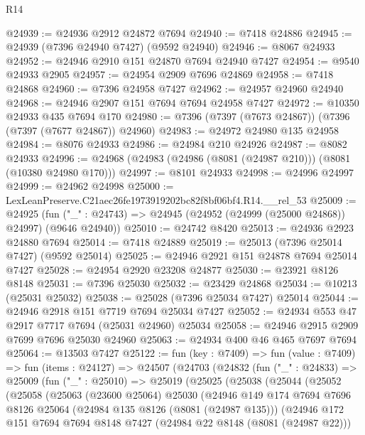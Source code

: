 \begin{lexlean}{R14}
\begin{coremodule}
@24939 := @24936 @2912 @24872 @7694
@24940 := @7418 @24886
@24945 := @24939 (@7396 @24940 @7427) (@9592 @24940)
@24946 := @8067 @24933
@24952 := @24946 @2910 @151 @24870 @7694 @24940 @7427
@24954 := @9540 @24933 @2905
@24957 := @24954 @2909 @7696 @24869
@24958 := @7418 @24868
@24960 := @7396 @24958 @7427
@24962 := @24957 @24960 @24940
@24968 := @24946 @2907 @151 @7694 @7694 @24958 @7427
@24972 := @10350 @24933 @435 @7694 @170
@24980 := @7396 (@7397 (@7673 @24867)) (@7396 (@7397 (@7677 @24867)) @24960)
@24983 := @24972 @24980 @135 @24958
@24984 := @8076 @24933
@24986 := @24984 @210 @24926
@24987 := @8082 @24933
@24996 := @24968 (@24983 (@24986 (@8081 (@24987 @210))) (@8081 (@10380 @24980 @170)))
@24997 := @8101 @24933
@24998 := @24996 @24997
@24999 := @24962 @24998
@25000 := LexLeanPreserve.C21aec26fe1973919202bc82f8bf06bf4.R14.__rel_53
@25009 := @24925
    (fun ("_" : @24743) => @24945 (@24952 (@24999 (@25000 @24868)) @24997) (@9646 @24940))
@25010 := @24742 @8420
@25013 := @24936 @2923 @24880 @7694
@25014 := @7418 @24889
@25019 := @25013 (@7396 @25014 @7427) (@9592 @25014)
@25025 := @24946 @2921 @151 @24878 @7694 @25014 @7427
@25028 := @24954 @2920 @23208 @24877
@25030 := @23921 @8126 @8148
@25031 := @7396 @25030
@25032 := @23429 @24868
@25034 := @10213 (@25031 @25032)
@25038 := @25028 (@7396 @25034 @7427) @25014
@25044 := @24946 @2918 @151 @7719 @7694 @25034 @7427
@25052 := @24934 @553 @47 @2917 @7717 @7694 (@25031 @24960) @25034
@25058 := @24946 @2915 @2909 @7699 @7696 @25030 @24960
@25063 := @24934 @400 @46 @465 @7697 @7694
@25064 := @13503 @7427
@25122 := fun (key : @7409) =>
  fun (value : @7409) =>
  fun (items : @24127) =>
  @24507
    (@24703
      (@24832
        (fun ("_" : @24833) =>
        @25009
          (fun ("_" : @25010) =>
          @25019
            (@25025
              (@25038
                (@25044
                  (@25052
                    (@25058
                      (@25063
                        (@23600 @25064)
                        @25030
                        (@24946
                          @149
                          @174
                          @7694
                          @7696
                          @8126
                          @25064
                          (@24984 @135 @8126 (@8081 (@24987 @135)))
                          (@24946
                            @172
                            @151
                            @7694
                            @7694
                            @8148
                            @7427
                            (@24984 @22 @8148 (@8081 (@24987 @22)))

\end{coremodule}
\end{lexlean}

